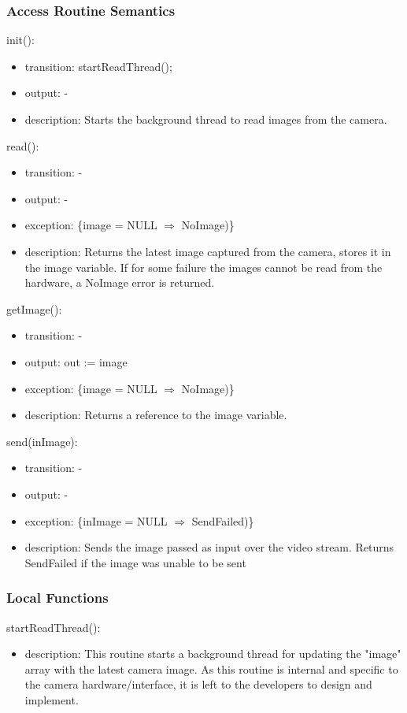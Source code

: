 \documentclass[12pt, titlepage]{article}
\begin{document}
\subsubsection{Access Routine Semantics}
\noindent init():
\begin{itemize}
\item transition: startReadThread();
\item output: -
\item description: Starts the background thread to read images from the camera.
\end{itemize}
\noindent read():
\begin{itemize}
\item transition: -
\item output: -
\item exception: \{image = NULL $\Rightarrow$ NoImage)\}
\item description: Returns the latest image captured from the camera, stores it in the image variable. If for some failure the images cannot be read from the hardware, a NoImage error is returned.  
\end{itemize}
\noindent getImage():
\begin{itemize}
\item transition: -
\item output: out := image 
\item exception: \{image = NULL $\Rightarrow$ NoImage)\}
\item description: Returns a reference to the image variable.  
\end{itemize}
\noindent send(inImage):
\begin{itemize}
\item transition: -
\item output: -
\item exception: \{inImage = NULL $\Rightarrow$ SendFailed)\}
\item description: Sends the image passed as input over the video stream. Returns SendFailed if the image was unable to be sent
\end{itemize}
\subsubsection{Local Functions}
\noindent startReadThread():
\begin{itemize}
\item description: This routine starts a background thread for updating the "image" array with the latest camera image. As this routine is internal and specific to the camera hardware/interface, it is left to the developers to design and implement. 
\end{itemize}
\newpage
\end{document}

